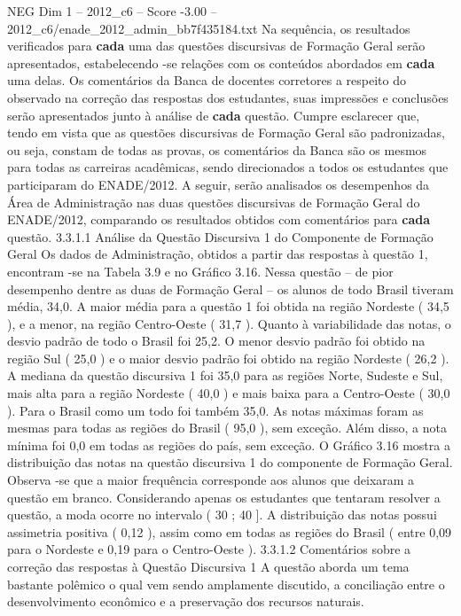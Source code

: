 \begin{textsample}{NEG Dim 1 – 2012\_c6 – Score -3.00 – 2012\_c6/enade\_2012\_admin\_bb7f435184.txt}
Na sequência, os resultados verificados para \textbf{cada} uma das questões discursivas de Formação Geral serão apresentados, estabelecendo -se relações com os conteúdos abordados em \textbf{cada} uma delas.
Os comentários da Banca de docentes corretores a respeito do observado na correção das respostas dos estudantes, suas impressões e conclusões serão apresentados junto à análise de \textbf{cada} questão.
Cumpre esclarecer que, tendo em vista que as questões discursivas de Formação Geral são padronizadas, ou seja, constam de todas as provas, os comentários da Banca são os mesmos para todas as carreiras acadêmicas, sendo direcionados a todos os estudantes que participaram do ENADE/2012.
A seguir, serão analisados os desempenhos da Área de Administração nas duas questões discursivas de Formação Geral do ENADE/2012, comparando os resultados obtidos com comentários para \textbf{cada} questão. 3.3.1.1 Análise da Questão Discursiva 1 do Componente de Formação Geral Os dados de Administração, obtidos a partir das respostas à questão 1, encontram -se na Tabela 3.9 e no Gráfico 3.16.
Nessa questão – de pior desempenho dentre as duas de Formação Geral – os alunos de todo Brasil tiveram média, 34,0.
A maior média para a questão 1 foi obtida na região Nordeste ( 34,5 ), e a menor, na região Centro-Oeste ( 31,7 ).
Quanto à variabilidade das notas, o desvio padrão de todo o Brasil foi 25,2.
O menor desvio padrão foi obtido na região Sul ( 25,0 ) e o maior desvio padrão foi obtido na região Nordeste ( 26,2 ).
A mediana da questão discursiva 1 foi 35,0 para as regiões Norte, Sudeste e Sul, mais alta para a região Nordeste ( 40,0 ) e mais baixa para a Centro-Oeste ( 30,0 ).
Para o Brasil como um todo foi também 35,0.
As notas máximas foram as mesmas para todas as regiões do Brasil ( 95,0 ), sem exceção.
Além disso, a nota mínima foi 0,0 em todas as regiões do país, sem exceção.
O Gráfico 3.16 mostra a distribuição das notas na questão discursiva 1 do componente de Formação Geral.
Observa -se que a maior frequência corresponde aos alunos que deixaram a questão em branco.
Considerando apenas os estudantes que tentaram resolver a questão, a moda ocorre no intervalo ( 30 ; 40 ].
A distribuição das notas possui assimetria positiva ( 0,12 ), assim como em todas as regiões do Brasil ( entre 0,09 para o Nordeste e 0,19 para o Centro-Oeste ). 3.3.1.2 Comentários sobre a correção das respostas à Questão Discursiva 1 A questão aborda um tema bastante polêmico o qual vem sendo amplamente discutido, a conciliação entre o desenvolvimento econômico e a preservação dos recursos naturais.

\end{textsample}
